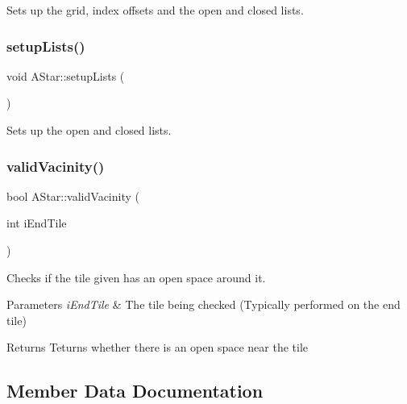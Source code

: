 Sets up the grid, index offsets and the open and closed lists. 

\mbox{\label{class_a_star_a01775826f813500ed1f27689cb58b22c}} 
\subsubsection{\texorpdfstring{setup\+Lists()}{setupLists()}}
{\footnotesize\ttfamily void A\+Star\+::setup\+Lists (\begin{DoxyParamCaption}{ }\end{DoxyParamCaption})}



Sets up the open and closed lists. 

\mbox{\label{class_a_star_a946acaa9502f5499888a765e1aa24280}} 
\subsubsection{\texorpdfstring{valid\+Vacinity()}{validVacinity()}}
{\footnotesize\ttfamily bool A\+Star\+::valid\+Vacinity (\begin{DoxyParamCaption}\item[{int}]{i\+End\+Tile }\end{DoxyParamCaption})}



Checks if the tile given has an open space around it. 


\begin{DoxyParams}{Parameters}
{\em i\+End\+Tile} & The tile being checked (Typically performed on the end tile) \\
\hline
\end{DoxyParams}
\begin{DoxyReturn}{Returns}
Teturns whether there is an open space near the tile 
\end{DoxyReturn}


\subsection{Member Data Documentation}
\mbox{\label{class_a_star_a4121e9b5155fdadce3add355279d9ed7}} 
